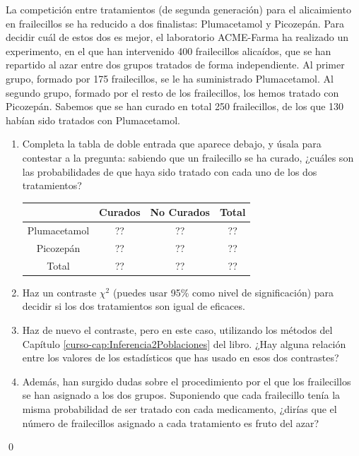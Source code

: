 \documentclass[10pt,a4paper]{article}\usepackage[]{graphicx}\usepackage[]{color}
\newcounter {cont01}
\begin{document}
\begin{ejercicio}
\label{tut12:ejercicio100}
La competición entre tratamientos (de segunda generación) para el alicaimiento en frailecillos se ha reducido a dos finalistas: Plumacetamol y Picozepán. Para decidir cuál de estos dos es mejor, el laboratorio ACME-Farma ha realizado un experimento, en el que han intervenido 400 frailecillos alicaídos, que se han repartido al azar entre dos grupos tratados de forma independiente. Al primer grupo, formado por 175 frailecillos, se le ha suministrado Plumacetamol. Al segundo grupo, formado por el resto de los frailecillos, los hemos tratado con Picozepán. Sabemos que se han curado en total 250 frailecillos, de los que 130 habían sido tratados con Plumacetamol.
\begin{enumerate}
  \item Completa la tabla de doble entrada que aparece debajo, y úsala para contestar a la pregunta: sabiendo que un frailecillo se ha curado, ¿cuáles son las probabilidades de que haya sido tratado con cada uno de los dos tratamientos?
          \begin{center}
          {\small
          \begin{tabular}{|c|c|c|c|}
              \hline
               & Curados & No Curados & Total \\
               \hline
              Plumacetamol & ?? & ?? & ?? \\
              \hline
              Picozepán & ?? & ?? & ?? \\
              \hline
              Total & ?? & ?? & ?? \\
              \hline
          \end{tabular}
          }
          \end{center}
  \item  Haz un contraste $\chi^2$ (puedes usar 95\% como nivel de significación) para decidir si los dos tratamientos son igual de eficaces.
  \item Haz de nuevo el contraste, pero en este caso, utilizando los métodos del Capítulo \ref{curso-cap:Inferencia2Poblaciones} del libro. ¿Hay alguna relación entre los valores de los estadísticos que has usado en esos dos contrastes?
  \item Además, han surgido dudas sobre el procedimiento por el que los frailecillos se han asignado a los dos grupos. Suponiendo que cada frailecillo tenía la misma probabilidad de ser tratado con cada medicamento, ¿dirías que el número de frailecillos asignado a cada tratamiento es fruto del azar?
\end{enumerate}

\qed
\end{ejercicio}
\end{document}
